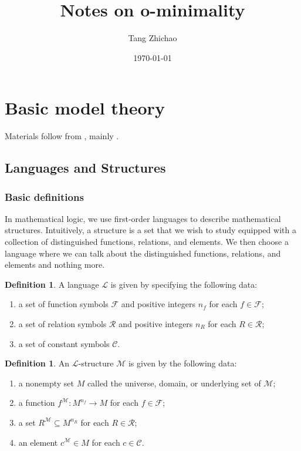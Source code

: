 \documentclass{amsart}
\title{Notes on o-minimality}
\author{Tang Zhichao}
\date{\today}
\theoremstyle{definition}
\newtheorem{definition}[theorem]{Definition}
\numberwithin{equation}{section}
\begin{document}
\maketitle

\section{Basic model theory}
Materials follow from \cite{zbMATH01821671,zbMATH01160037},
mainly \cite{zbMATH01821671}.
\subsection{Languages and Structures}
\subsubsection{Basic definitions}
In mathematical logic,
we use first-order languages to describe mathematical structures.
Intuitively, a structure is a set that we wish to study equipped with a collection of distinguished functions, relations, and elements.
We then choose a language where we can talk about the distinguished functions, relations, and elements and nothing more.

\begin{definition}
A language $\mathcal{L}$ is given by specifying the following data:
\begin{enumerate}[label = {(\roman*)}]
    \item a set of function symbols $\mathcal{F}$ and positive integers $n_f$ for each $f \in \mathcal{F}$;
    \item a set of relation symbols $\mathcal{R}$ and positive integers $n_R$ for each $R \in \mathcal{R}$;
    \item a set of constant symbols $\mathcal{C}$.
\end{enumerate}
\end{definition}

\begin{definition}
An $\mathcal{L}$-structure $\mathcal{M}$ is given by the following data:
    \begin{enumerate}[label = {(\roman*)}]
    \item a nonempty set $M$ called the universe, domain, or underlying set of $\mathcal{M}$;
    \item a function $f^{\mathcal{M}} : M^{n_f} \to M$ for each $f \in \mathcal{F}$;
    \item a set $R^{\mathcal{M}} \subseteq M^{n_R}$ for each $R \in \mathcal{R}$;
    \item an element $c^{\mathcal{M}} \in M$ for each $c \in \mathcal{C}$.
    \end{enumerate}
\end{definition}
\end{document}
